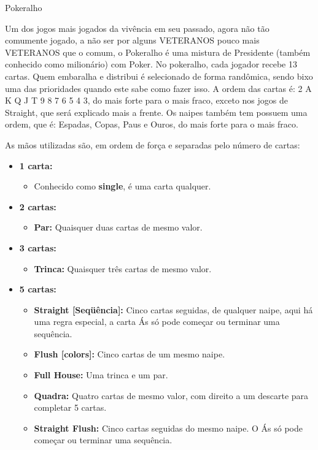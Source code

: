 \begin{subsecao}{Pokeralho}

Um dos jogos mais jogados da vivência em seu passado, agora não tão comumente
jogado, a não ser por alguns VETERANOS pouco mais VETERANOS que o comum, o
Pokeralho é uma mistura de Presidente (também conhecido como milionário) com 
Poker. No pokeralho, cada jogador recebe 13 cartas. Quem embaralha e distribui é
selecionado de forma randômica, sendo bixo uma das prioridades quando este sabe
como fazer isso. A ordem das cartas é: 2 A K Q J T 9 8 7 6 5 4 3, do mais forte
para o mais fraco, exceto nos jogos de Straight, que será explicado mais a 
frente. Os naipes também tem possuem uma ordem, que é: Espadas, Copas, Paus e 
Ouros, do mais forte para o mais fraco. 

As mãos utilizadas são, em ordem de força e separadas pelo número de cartas:
\begin{itemize}

\item \textbf {1 carta:}
\begin{itemize}
\item Conhecido como \textbf{single}, é uma carta qualquer.
\end{itemize}
\item \textbf {2 cartas:}
\begin{itemize}

\item \textbf{Par:} Quaisquer duas cartas de mesmo valor.
\end{itemize}
\item \textbf {3 cartas:}

\begin{itemize}
\item \textbf{Trinca:} Quaisquer três cartas de mesmo valor.
\end{itemize}
\item \textbf {5 cartas:}

\begin{itemize}
\item \textbf{Straight [Seqüência]:} Cinco cartas seguidas, de qualquer naipe,
aqui há uma regra especial, a carta Ás só pode começar ou terminar uma
sequência.
\item \textbf{Flush [colors]:} Cinco cartas de um mesmo naipe.
\item \textbf{Full House:} Uma trinca e um par.
\item \textbf{Quadra:} Quatro cartas de mesmo valor, com direito a um descarte
para completar 5 cartas.
\item \textbf{Straight Flush:} Cinco cartas seguidas do mesmo naipe. O Ás só
pode começar ou terminar uma sequência. 
\end{itemize}


\end{itemize}
\end{subsecao}
